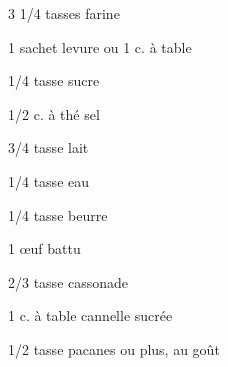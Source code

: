 %
%   
%   
%   
%





\totaltime{}


\begin{ingredients}
    \item 3 1/4 tasses farine
    \item 1 sachet levure ou 1 c. à table
    \item 1/4 tasse sucre
    \item 1/2 c. à thé sel
    \item 3/4 tasse lait
    \item 1/4 tasse eau
    \item 1/4 tasse beurre
    \item 1 œuf battu
    \item 2/3 tasse cassonade
    \item 1 c. à table cannelle sucrée
    \item 1/2 tasse pacanes ou plus, au goût
\end{ingredients}

